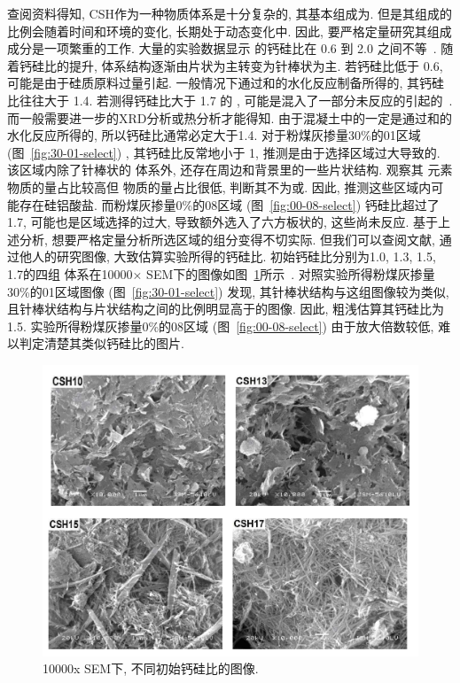 查阅资料得知, CSH作为一种物质体系是十分复杂的, 其基本组成为. 但是其组成的比例会随着时间和环境的变化, 长期处于动态变化中. 因此, 要严格定量研究其组成成分是一项繁重的工作.
大量的实验数据显示  的钙硅比在 \num{0.6} 到 \num{2.0} 之间不等~\cite{lv_concrete}. 随着钙硅比的提升, 体系结构逐渐由片状为主转变为针棒状为主. 若钙硅比低于 \num{0.6}, 可能是由于硅质原料过量引起. 一般情况下通过和的水化反应制备所得的, 其钙硅比往往大于 \num{1.4}. 若测得钙硅比大于 \num{1.7} 的 , 可能是混入了一部分未反应的引起的~\cite{zhao_hydrated}. 而一般需要进一步的XRD分析或热分析才能得知. 
由于混凝土中的一定是通过和的水化反应所得的, 所以钙硅比通常必定大于\num{1.4}. 对于粉煤灰掺量30\%的01区域 (图~\ref{fig:30-01-select}) , 其钙硅比反常地小于 \num{1}, 推测是由于选择区域过大导致的. 该区域内除了针棒状的 体系外, 还存在周边和背景里的一些片状结构. 观察其 元素物质的量占比较高但  物质的量占比很低, 判断其不为或. 因此, 推测这些区域内可能存在硅铝酸盐. 而粉煤灰掺量0\%的08区域 (图~\ref{fig:00-08-select}) 钙硅比超过了 \num{1.7}, 可能也是区域选择的过大, 导致额外选入了六方板状的, 这些尚未反应.
基于上述分析, 想要严格定量分析所选区域的组分变得不切实际. 但我们可以查阅文献, 通过他人的研究图像, 大致估算实验所得的钙硅比. 初始钙硅比分别为\num{1.0}, \num{1.3}, \num{1.5}, \num{1.7}的四组  体系在10000× SEM下的图像如图~\ref{fig:lv_csh}所示~\cite{lv_ca}. 对照实验所得粉煤灰掺量30\%的01区域图像 (图~\ref{fig:30-01-select}) 发现, 其针棒状结构与这组图像较为类似, 且针棒状结构与片状结构之间的比例明显高于的图像. 因此, 粗浅估算其钙硅比为\num{1.5}. 实验所得粉煤灰掺量0\%的08区域 (图~\ref{fig:00-08-select}) 由于放大倍数较低, 难以判定清楚其类似钙硅比的图片. 

\begin{figure}
  \centering
  \includegraphics[width=\linewidth]{figures/exp3/lv_csh.png}
  \caption{10000x SEM下, 不同初始钙硅比的图像. }
  \label{fig:lv_csh}
\end{figure}


